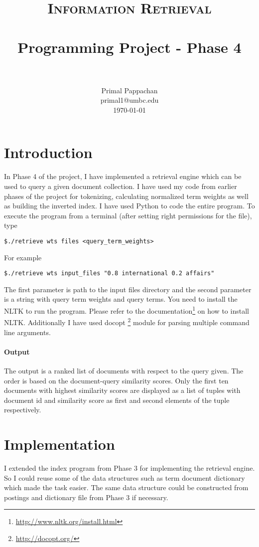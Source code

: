 \documentclass[paper=a4, fontsize=11pt]{scrartcl}
\title{
		\usefont{OT1}{bch}{b}{n}
		\normalfont \normalsize \textsc{Information Retrieval} \\ [25pt]
		\horrule{0.5pt} \\[0.4cm]
		\huge Programming Project - Phase 4 \\
		\horrule{2pt} \\[0.5cm]
}
\author{
		\normalfont 								\normalsize
        Primal Pappachan\\[-3pt]		\normalsize
        primal1@umbc.edu\\[-3pt]		\normalsize
        \today
}
\date{}
\numberwithin{equation}{section}		%
\numberwithin{figure}{section}			%
\numberwithin{table}{section}				%
\begin{document}
\maketitle
\section{Introduction}
In Phase 4 of the project, I have implemented a retrieval engine which can be used to query a given document collection. I have used my code from earlier phases of the project for tokenizing, calculating normalized term weights as well as building the inverted index. I have used Python to code the entire program. To execute the program from a terminal (after setting right permissions for the file), type 

\begin{verbatim}
$./retrieve wts files <query_term_weights> 
\end{verbatim}

For example
\begin{verbatim}
$./retrieve wts input_files "0.8 international 0.2 affairs"
\end{verbatim}

The first parameter is path to the input files directory and the second parameter is a string with query term weights and query terms. You need to install the NLTK to run the program. Please refer to the documentation\footnote{\url{http://www.nltk.org/install.html}} on how to install NLTK. Additionally I have used docopt \footnote{\url{http://docopt.org/}} module for parsing multiple command line arguments.

\paragraph{Output}

The output is a ranked list of documents with respect to the query given. The order is based on the document-query similarity scores. Only the first ten documents with highest similarity scores are displayed as a list of tuples with document id and similarity score as first and second elements of the tuple respectively.

\section{Implementation}

I extended the index program from Phase 3 for implementing the retrieval engine. So I could reuse some of the data structures such as term document dictionary which made the task easier. The same data structure could be constructed from postings and dictionary file from Phase 3 if necessary. 
\end{document}
